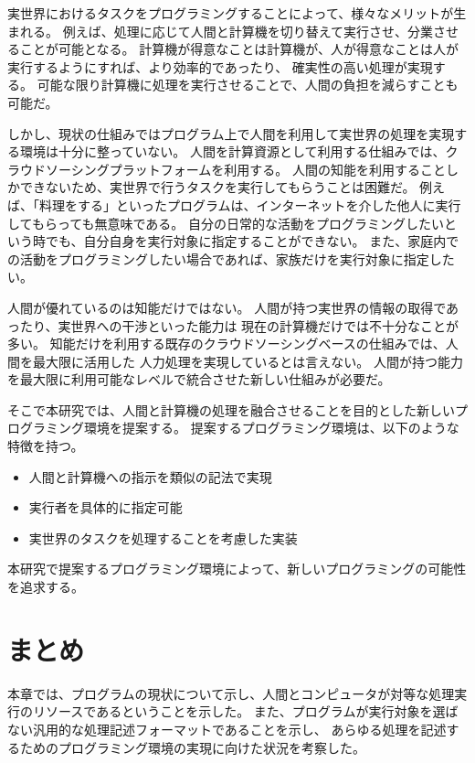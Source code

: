 実世界におけるタスクをプログラミングすることによって、様々なメリットが生まれる。
例えば、処理に応じて人間と計算機を切り替えて実行させ、分業させることが可能となる。
計算機が得意なことは計算機が、人が得意なことは人が実行するようにすれば、より効率的であったり、
確実性の高い処理が実現する。
可能な限り計算機に処理を実行させることで、人間の負担を減らすことも可能だ。

しかし、現状の仕組みではプログラム上で人間を利用して実世界の処理を実現する環境は十分に整っていない。
人間を計算資源として利用する仕組みでは、クラウドソーシングプラットフォームを利用する。
人間の知能を利用することしかできないため、実世界で行うタスクを実行してもらうことは困難だ。
例えば、「料理をする」といったプログラムは、インターネットを介した他人に実行してもらっても無意味である。
自分の日常的な活動をプログラミングしたいという時でも、自分自身を実行対象に指定することができない。
また、家庭内での活動をプログラミングしたい場合であれば、家族だけを実行対象に指定したい。

人間が優れているのは知能だけではない。
人間が持つ実世界の情報の取得であったり、実世界への干渉といった能力は
現在の計算機だけでは不十分なことが多い。
知能だけを利用する既存のクラウドソーシングベースの仕組みでは、人間を最大限に活用した
人力処理を実現しているとは言えない。
人間が持つ能力を最大限に利用可能なレベルで統合させた新しい仕組みが必要だ。

そこで本研究では、人間と計算機の処理を融合させることを目的とした新しいプログラミング環境を提案する。
提案するプログラミング環境は、以下のような特徴を持つ。

\begin{itemize}
\itemsep1pt\parskip0pt
\item
  人間と計算機への指示を類似の記法で実現
\item
  実行者を具体的に指定可能
\item
  実世界のタスクを処理することを考慮した実装
\end{itemize}

本研究で提案するプログラミング環境によって、新しいプログラミングの可能性を追求する。

\section{まとめ}\label{ux307eux3068ux3081}

本章では、プログラムの現状について示し、人間とコンピュータが対等な処理実行のリソースであるということを示した。
また、プログラムが実行対象を選ばない汎用的な処理記述フォーマットであることを示し、
あらゆる処理を記述するためのプログラミング環境の実現に向けた状況を考察した。
